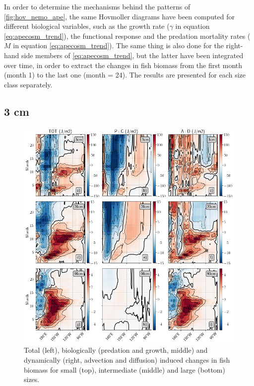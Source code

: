 In order to determine the mechanisms behind the patterns of \ref{fig:hov_nemo_ape}, the same Hovmoller diagrams have been computed for different biological variables, such as the growth rate ($\gamma$ in equation \ref{eq:apecosm_trend}), the functional response and the predation mortality rates ($M$ in equation \ref{eq:apecosm_trend}). The same thing is also done for the right-hand side members of \ref{eq:apecosm_trend}, but the latter have been integrated over time, in order to extract the changes in fish biomass from the first month (month 1) to the last one (month = 24). The results are presented for each size class separately.

\subsection{3 cm}

\begin{figure}[h!tp]
	\centering
	\includegraphics[scale=0.4]{figs/fig7.png}	
	\caption{Total (left), biologically (predation and growth, middle) and dynamically (right, advection and diffusion) induced changes in fish biomass for small (top), intermediate (middle) and large (bottom) sizes.}
	\label{fig:fig7}
\end{figure}

